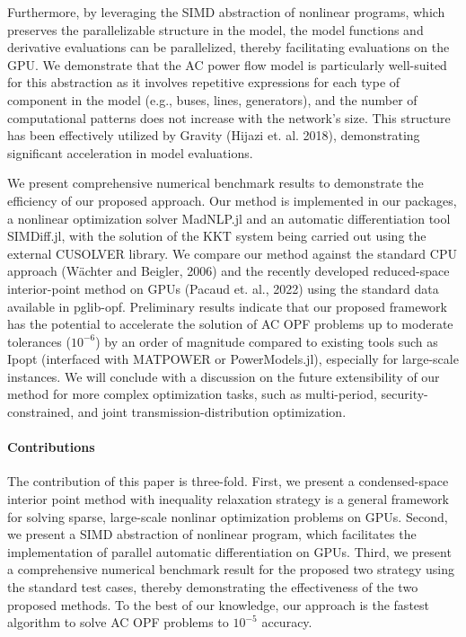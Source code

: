 Furthermore, by leveraging the SIMD abstraction of nonlinear programs,
which preserves the parallelizable structure in the model, the model
functions and derivative evaluations can be parallelized, thereby
facilitating evaluations on the GPU. We demonstrate that the AC power
flow model is particularly well-suited for this abstraction as it
involves repetitive expressions for each type of component in the
model (e.g., buses, lines, generators), and the number of
computational patterns does not increase with the network's size. This
structure has been effectively utilized by Gravity (Hijazi
et. al. 2018), demonstrating significant acceleration in model
evaluations.

We present comprehensive numerical benchmark results to demonstrate
the efficiency of our proposed approach. Our method is implemented in
our packages, a nonlinear optimization solver MadNLP.jl and an
automatic differentiation tool SIMDiff.jl, with the solution of the
KKT system being carried out using the external CUSOLVER library. We
compare our method against the standard CPU approach (W\"{a}chter and
Beigler, 2006) and the recently developed reduced-space interior-point
method on GPUs (Pacaud et. al., 2022) using the standard data
available in pglib-opf. Preliminary results indicate that our proposed
framework has the potential to accelerate the solution of AC OPF
problems up to moderate tolerances ($10^{-6}$) by an order of
magnitude compared to existing tools such as Ipopt (interfaced with
MATPOWER or PowerModels.jl), especially for large-scale instances. We
will conclude with a discussion on the future extensibility of our
method for more complex optimization tasks, such as multi-period,
security-constrained, and joint transmission-distribution
optimization.

\paragraph*{Contributions}
The contribution of this paper is three-fold. First, we present a condensed-space interior point method with inequality relaxation strategy is a general framework for solving sparse, large-scale nonlinar optimization problems on GPUs. Second, we present a SIMD abstraction of nonlinear program, which facilitates the implementation of parallel automatic differentiation on GPUs. Third, we present a comprehensive numerical benchmark result for the proposed two strategy using the standard test cases, thereby demonstrating the effectiveness of the two proposed methods. To the best of our knowledge, our approach is the fastest algorithm to solve AC OPF problems to $10^{-5}$ accuracy.

